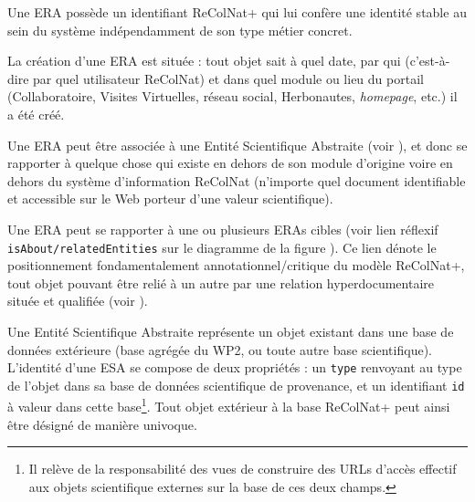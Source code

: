\startitemize
\item Une ERA possède un identifiant ReColNat+ qui lui confère une identité stable au sein du système indépendamment de son type métier concret.
\item La création d'une ERA est située : tout objet sait à quel date, par qui (c'est-à-dire par quel utilisateur ReColNat) et dans quel module ou lieu du portail (Collaboratoire, Visites Virtuelles, réseau social, Herbonautes, {\it homepage}, etc.) il a été créé.
\item Une ERA peut être associée à une Entité Scientifique Abstraite (voir ), et donc se rapporter à quelque chose qui existe en dehors de son module d'origine voire en dehors du système d'information ReColNat (n'importe quel document identifiable et accessible sur le Web porteur d'une valeur scientifique).
\item Une ERA peut se rapporter à une ou plusieurs ERAs  cibles (voir lien réflexif {\tt isAbout/relatedEntities} sur le diagramme de la figure ).
Ce lien dénote le positionnement fondamentalement annotationnel/critique du modèle ReColNat+, tout objet pouvant être relié à un autre par une relation hyperdocumentaire située et qualifiée (voir ).
\stopitemize

\stopsection
\startsection[title={Entité Scientifique Abstraite (ESA)},reference=model:base:esa]

Une Entité Scientifique Abstraite représente un objet existant dans une base de données extérieure (base agrégée du WP2, ou toute autre base scientifique).
L'identité d'une ESA se compose de deux propriétés : un {\tt type} renvoyant au type de l'objet dans sa base de données scientifique de provenance, et un identifiant {\tt id} à valeur dans cette base\footnote{Il relève de la responsabilité des vues de construire des URLs d'accès effectif aux objets scientifique externes sur la base de ces deux champs.}.
Tout objet extérieur à la base ReColNat+ peut ainsi être désigné de manière univoque.

\stopsection
\startsection[title={Relations & Opinions},reference=model:base:opirel]

